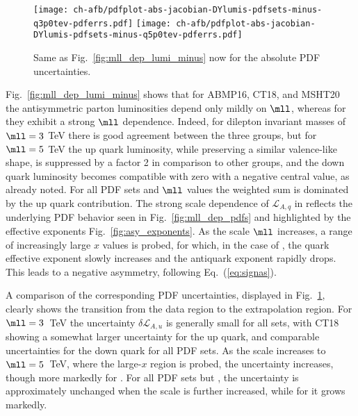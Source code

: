\begin{figure}[!t]
 \centering
 \texttt{[image: ch-afb/pdfplot-abs-jacobian-DYlumis-pdfsets-minus-q3p0tev-pdferrs.pdf]}
 \texttt{[image: ch-afb/pdfplot-abs-jacobian-DYlumis-pdfsets-minus-q5p0tev-pdferrs.pdf]}
 \caption{Same as Fig.~\ref{fig:mll_dep_lumi_minus} now for the absolute PDF uncertainties.
    }    
 \label{fig:mll_dep_lumi_minus_pdferrs}
\end{figure}

Fig.~\ref{fig:mll_dep_lumi_minus} shows that for ABMP16, CT18, and
MSHT20 the antisymmetric
parton luminosities depend only mildly on $\mll$, whereas for 
they exhibit a strong $\mll$ dependence.
%
Indeed, for dilepton invariant masses of $\mll=3$ TeV there is good
agreement between the three groups, but
for $\mll=5$ TeV the  up quark luminosity, while preserving a
similar valence-like shape, is suppressed
by a factor 2 in comparison  to other groups, and the down quark luminosity becomes compatible with zero with a negative
central value,  as already noted. 
%
For all PDF sets and  $\mll$ values the weighted sum is dominated by the up quark contribution.
The strong scale dependence of $\mathcal{L}_{A,q}$ in 
reflects the underlying PDF behavior seen in  Fig.~\ref{fig:mll_dep_pdfs}
and highlighted by the effective exponents Fig.~\ref{fig:asy_exponents}.
%
As the scale $\mll$ increases, a range of increasingly large $x$ values is probed,
for which, in the case of
, the quark effective exponent slowly increases and the
antiquark exponent rapidly drops.
%
This leads to a negative asymmetry, 
following  Eq.~(\ref{eq:signas}). 

A comparison of the corresponding PDF uncertainties, displayed in
Fig.~\ref{fig:mll_dep_lumi_minus_pdferrs}, clearly shows the transition
from the data region to the extrapolation region.
%
For
$\mll=3$~TeV the uncertainty $\delta \mathcal{L}_{A,u}$ is generally
small for all sets, with CT18
showing a somewhat larger uncertainty for the up quark, and comparable
uncertainties for the down quark for all PDF sets.
%
As the scale  increases to $\mll=5$~TeV, where the large-$x$ region is
probed,  the uncertainty 
increases, though more markedly for .
%
For all PDF sets but
, the
uncertainty is approximately unchanged when the scale is further increased,
while for  it grows markedly.


